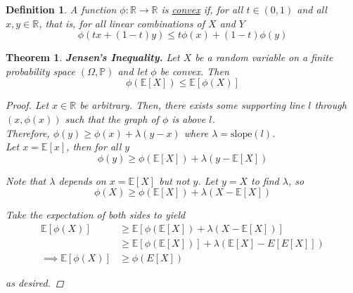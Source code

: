 \documentclass[12pt]{article}
\newtheorem{definition}{Definition}
\newtheorem{theorem}{Theorem}
\newcommand{\R}{\mathbb R}
\renewcommand{\P}{\mathbb P}
\newcommand{\E}{\mathbb E}
\begin{document}
\begin{definition} A function $\phi: \R \to \R$ is \underline{convex} if, for all $t \in (0, 1)$ and all $x, y \in \R$, that is, for all linear combinations of $X$ and $Y$
\begin{equation*}
	\phi(tx + (1 - t)y) \leq t\phi(x) + (1 - t)\phi(y)
\end{equation*}
\end{definition}

\begin{theorem} {\bf Jensen's Inequality.} Let $X$ be a random variable on a finite probability space $(\Omega, \P)$ and let $\phi$ be convex. Then
\begin{equation*}
	\phi(\E[X]) \leq \E[\phi(X)]
\end{equation*}

\begin{proof} Let $x \in \R$ be arbitrary. Then, there exists some supporting line $l$ through $(x, \phi(x))$ such that the graph of $\phi$ is above $l$. \\

Therefore, $\phi(y) \geq \phi(x) + \lambda(y - x)$ where $\lambda = \text{slope}(l)$. \\

Let $x = \E[x]$, then for all $y$
\begin{equation*}
	\phi(y) \geq \phi(\E[X]) + \lambda(y - \E[X])
\end{equation*}

Note that $\lambda$ depends on $x = \E[X]$ but not $y$. Let $y = X$ to find $\lambda$, so
\begin{equation*}
	\phi(X) \geq \phi(\E[X]) + \lambda(X - \E[X])
\end{equation*}

Take the expectation of both sides to yield
\begin{align*}
	\E[\phi(X)] &\geq \E[\phi(\E[X]) + \lambda(X - \E[X])] \\
	&\geq \E[\phi(\E[X])] + \lambda(\E[X] - E[E[X]]) \\
	\implies \E[\phi(X)] &\geq \phi(E[X])
\end{align*}

as desired.
\end{proof}
\end{theorem}
\end{document}
